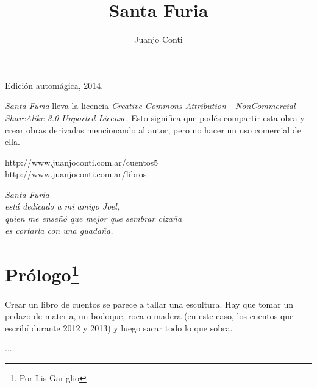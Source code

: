 \documentclass[12pt,twoside,openright,a5paper]{book}
\title{Santa Furia}
\author{Juanjo Conti}
\date{}
\begin{document}
\pagestyle{plain}

\maketitle


\thispagestyle{empty}
\noindent
Edición automágica, 2014.\\

\vspace{0.5cm}

\noindent
\emph{Santa Furia} lleva la licencia 
\emph{Creative Commons Attribution - NonCommercial - ShareAlike 3.0 Unported License}.
Esto significa que podés compartir esta obra y crear obras derivadas
mencionando al autor, pero no ha\-cer un uso comercial de ella.

\vfill

\noindent
http://www.juanjoconti.com.ar/cuentos5\\

\noindent
http://www.juanjoconti.com.ar/libros

\cleardoublepage

\noindent
\begin{flushright}
\emph{
\emph{Santa Furia}\\
está dedicado a mi amigo Joel,\\
quien me enseñó que mejor que sembrar cizaña\\
es cortarla con una guadaña.
}
\end{flushright}

\cleardoublepage

\renewcommand*\contentsname{Índice}

\tableofcontents

\chapter*{Prólogo\footnote{Por Lis Gariglio}}

Crear un libro de cuentos se parece a tallar una escultura. 
Hay que tomar un pedazo de materia, un bodoque, roca o madera 
(en este caso, los cuentos que escribí durante 2012 y 2013)
y luego sacar todo lo que sobra.

...

 
 
 
 
 
 
 
 
 
 
 
 
 
 


\end{document}
